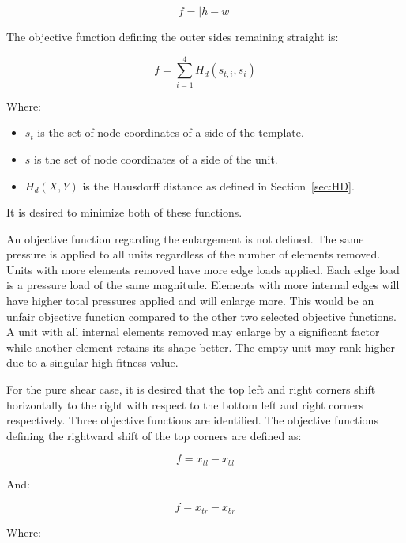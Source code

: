 \begin{equation}
	f=\left | h-w \right |
\end{equation}

The objective function defining the outer sides remaining straight is:

\begin{equation}
	f=\sum_{i=1}^{4}H_{d}\left ( s_{t,i},s_{i} \right )
\end{equation}

Where:

\begin{itemize}
	\item $s_{t}$ is the set of node coordinates of a side of the template.
	\item $s$ is the set of node coordinates of a side of the unit.
	\item $H_{d}\left ( X,Y \right )$ is the Hausdorff distance as defined in Section~\ref{sec:HD}.
\end{itemize}

It is desired to minimize both of these functions.

An objective function regarding the enlargement is not defined. The same pressure is applied to all units regardless of the number of elements removed. Units with more elements removed have more edge loads applied. Each edge load is a pressure load of the same magnitude. Elements with more internal edges will have higher total pressures applied and will enlarge more. This would be an unfair objective function compared to the other two selected objective functions. A unit with all internal elements removed may enlarge by a significant factor while another element retains its shape better. The empty unit may rank higher due to a singular high fitness value.

For the pure shear case, it is desired that the top left and right corners shift horizontally to the right with respect to the bottom left and right corners respectively. Three objective functions are identified. The objective functions defining the rightward shift of the top corners are defined as:

\begin{equation}
	f=x_{tl}-x_{bl}
\end{equation}

And:

\begin{equation}
	f=x_{tr}-x_{br}
\end{equation}

Where:

